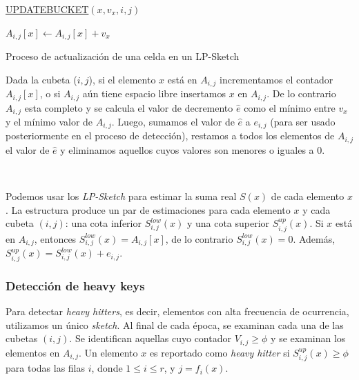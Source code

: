 \documentclass[a4paper,12pt, oneside]{article}
\begin{document}
\begin{algorithm}[ht]
	
	\underline{UPDATEBUCKET}$(x, v_x, i, j)$\;
	
	{
		$A_{i,j}[x] \leftarrow A_{i,j}[x] + v_x$\;
	}{
	}
	
	\caption{Proceso de actualización de una celda en un LP-Sketch}
	\label{alg:updatebucket}
\end{algorithm}	


Dada la cubeta ($i,j$), si el elemento $x$ está en $A_{i,j}$ incrementamos el contador $A_{i,j}[x]$, o si $A_{i,j}$ aún tiene espacio libre insertamos $x$ en $A_{i,j}$. De lo contrario $A_{i,j}$ esta completo y se calcula el valor de decremento $\hat{e}$ como el mínimo entre $v_x$ y el mínimo valor de $A_{i,j}$. Luego, sumamos el valor de $\hat{e}$ a $e_{i,j}$ (para ser usado posteriormente en el proceso de detección), restamos a todos los elementos de $A_{i,j}$ el valor de $\hat{e}$ y eliminamos aquellos cuyos valores son menores o iguales a $0$.

\

Podemos usar los \textit{LP-Sketch} para estimar la suma real $S(x)$ de cada elemento $x$. La estructura produce un par de estimaciones para cada elemento $x$ y cada cubeta $(i,j)$: una cota inferior $S_{i,j}^{low}(x)$ y una cota superior $S_{i,j}^{up}(x)$. Si $x$ está en $A_{i,j}$, entonces $S_{i,j}^{low}(x) = A_{i,j}[x]$, de lo contrario $S_{i,j}^{low}(x) = 0$. Además, $S_{i,j}^{up}(x) = S_{i,j}^{low}(x) + e_{i,j}$.

\subsubsection{Detección de heavy keys}
Para detectar \textit{heavy hitters}, es decir, elementos con alta frecuencia de ocurrencia, utilizamos un único \textit{sketch}. Al final de cada época, se examinan cada una de las cubetas $(i,j)$. Se identifican aquellas cuyo contador $V_{i,j} \geq \phi$ y se examinan los elementos en $A_{i,j}$. Un elemento $x$ es reportado como \textit{heavy hitter} si $S_{i,j}^{up}(x) \geq \phi$ para todas las filas $i$, donde $1 \leq i \leq r$, y $j = f_i(x)$.
\end{document}
